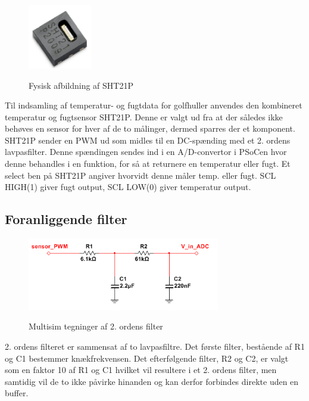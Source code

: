 
\begin{figure}[htb]
\centering
{\includegraphics[width=0.25\textwidth]{filer/design/Billeder/sht21p_fysisk.png}}
\caption{Fysisk afbildning af SHT21P}
\label{lab:sht_filter}
\end{figure}

Til indsamling af temperatur- og fugtdata for golfhuller anvendes den kombineret temperatur og fugtsensor SHT21P. Denne er valgt ud fra at der således ikke behøves en sensor for hver af de to målinger, dermed sparres der et komponent. SHT21P sender en PWM ud som midles til en DC-spænding med et 2. ordens lavpasfilter. Denne spændingen sendes ind i en A/D-convertor i PSoCen hvor denne behandles i en funktion, for så at returnere en temperatur eller fugt. Et select ben på SHT21P angiver hvorvidt denne måler temp. eller fugt. SCL HIGH(1) giver fugt output, SCL LOW(0) giver temperatur output.

\subsection{Foranliggende filter}
\begin{figure}[htb]
\centering
{\includegraphics[width=0.75\textwidth]{filer/design/Billeder/sht21p_filter_pic.png}}
\caption{Multisim tegninger af 2. ordens filter}
\label{lab:sht_filter_pic}
\end{figure}

2. ordens filteret er sammensat af to lavpasfiltre. Det første filter, bestående af R1 og C1 bestemmer knækfrekvensen. Det efterfølgende filter, R2 og C2, er valgt som en faktor 10 af R1 og C1 hvilket vil resultere i et 2. ordens filter, men samtidig vil de to ikke påvirke hinanden og kan derfor forbindes direkte uden en buffer. 

